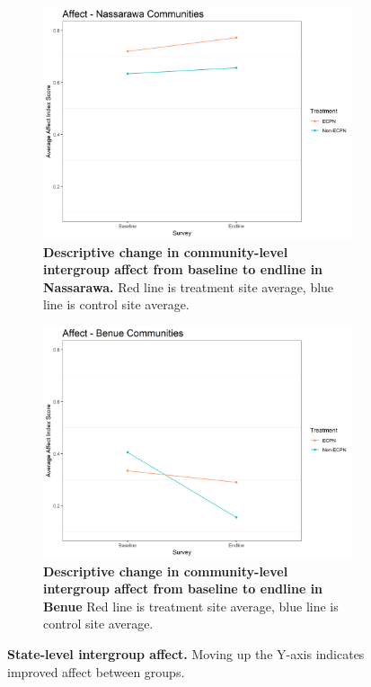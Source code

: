 \documentclass[11pt]{article}
\begin{document}
\begin{figure}[H]
    \begin{subfigure}[b]{.48\textwidth}
    \centering
        \includegraphics[width=\linewidth]{../../../figs/affectComm_plot_nas.png}
        \caption{\textbf{Descriptive change in community-level intergroup affect from baseline to endline in Nassarawa.} Red line is treatment site average, blue line is control site average.}
        \label{fig:affect_nas}
    \end{subfigure}
    \hfill
    \begin{subfigure}[b]{.48\textwidth}
    \centering
        \includegraphics[width=\linewidth]{../../../figs/affectComm_plot_ben.png}
        \caption{\textbf{Descriptive change in community-level intergroup affect from baseline to endline in Benue} Red line is treatment site average, blue line is control site average.}
        \label{fig:affect_ben}
    \end{subfigure}
    \caption{\textbf{State-level intergroup affect.}  Moving up the Y-axis indicates improved affect between groups.}
\end{figure}
\end{document}
